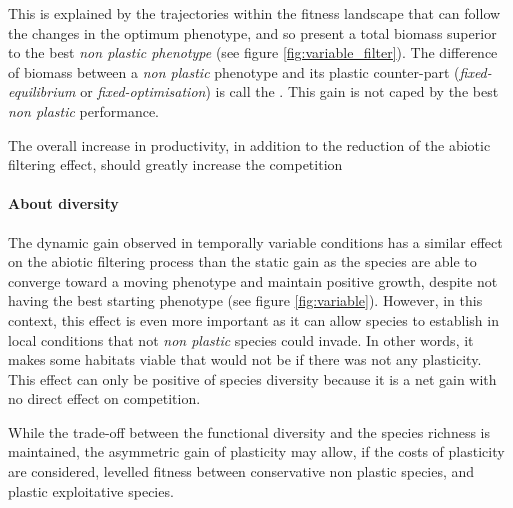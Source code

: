 This is explained by the trajectories within the fitness landscape that can follow the changes in the optimum phenotype, and so present a total biomass superior to the best \textit{non plastic phenotype} (see figure \ref{fig:variable_filter}). The difference of biomass between a \textit{non plastic} phenotype and its plastic counter-part (\textit{fixed-equilibrium} or \textit{fixed-optimisation}) is call the .  This gain is not caped by the best \textit{non plastic} performance.


The overall increase in productivity, in addition to the reduction of the abiotic filtering effect, should greatly increase the competition





\paragraph{About diversity}

The dynamic gain observed in temporally variable conditions has a similar effect on the abiotic filtering process than the static gain as the species are able to converge toward a moving phenotype and maintain positive growth, despite not having the best starting phenotype (see figure \ref{fig:variable}). However, in this context, this effect is even more important as it can allow species to establish in local conditions that not \textit{non plastic} species could invade. In other words, it makes some habitats viable that would not be if there was not any plasticity. This effect can only be positive of species diversity because it is a net gain with no direct effect on competition.

While the trade-off between the functional diversity and the species richness is maintained, the asymmetric gain of plasticity may allow, if the costs of plasticity are considered, levelled fitness between conservative non plastic species, and plastic exploitative species.\\ %



